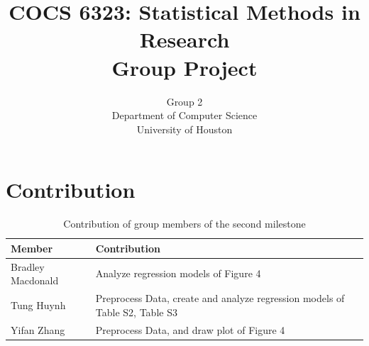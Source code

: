 \documentclass[10pt]{article}          %
\title{COCS 6323: Statistical Methods in Research \\ Group Project} %
\author{Group 2 \\
        Department of Computer Science\\
        University of Houston}         %
\begin{document}



\maketitle              %

\newpage
\tableofcontents        %
\listoftables           %
\listoffigures          %

\newpage
\section{Contribution}
\begin{table}[h]
\begin{tabular}{|p{4cm}|p{13cm}|}
\hline
\textbf{Member} & \textbf{Contribution} \\ \hline
Bradley Macdonald & Analyze regression models of Figure 4\\ \hline
Tung Huynh & Preprocess Data, create and analyze regression models of Table S2, Table S3\\ \hline
Yifan Zhang & Preprocess Data, and draw plot of Figure 4 \\ \hline
\end{tabular}
\caption{Contribution of group members of the second milestone}
\label{tbl:contribution}
\end{table}

\newpage
\end{document}
